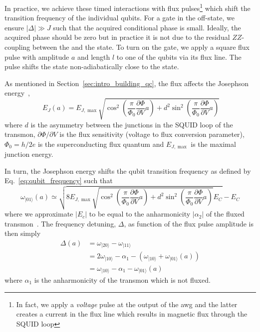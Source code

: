 In practice, we achieve these timed interactions with flux pulses\footnote{In fact, we apply a \textit{voltage} pulse at the output of the \gls{awg} and the latter creates a current in the flux line which results in magnetic flux through the SQUID loop} which shift the transition frequency of the individual qubits. For a gate in the off-state, we ensure $|\Delta|\gg J$ such that the acquired conditional phase is small. Ideally, the acquired phase should be zero but in practice it is not due to the residual $ZZ$-coupling between the \oo{} and the \tz{} state. To turn on the gate, we apply a square flux pulse with amplitude $a$ and length $l$ to one of the qubits via its flux line. The pulse shifts the \oo{} state non-adiabatically close to the \tz{} state. 

As mentioned in Section~\ref{sec:intro_building_qc}, the flux affects the Josephson energy~\cite[Eq.~2.18]{KochCharge-insensitiveBox}, 
\begin{equation}\
    E_J(a) = E _ { J , \max } \sqrt { \cos ^ { 2 } \left( \frac{\pi}{\Phi_0} \frac { \partial \Phi } { \partial V } a \right) + d ^ { 2 } \sin ^ { 2 } \left( \frac{\pi}{\Phi_0}\frac { \partial \Phi} { \partial V } a \right) }
\end{equation}
where $d$ is the asymmetry between the junctions in the SQUID loop of the transmon, $ \partial \Phi /\partial V $ is the flux sensitivity (voltage to flux conversion parameter), $\Phi_0 = h/2e$ is the superconducting flux quantum and $E _ { J , \max }$ is the maximal junction energy. 

In turn, the Josephson energy shifts the qubit transition frequency as defined by Eq.~\eqref{eq:qubit_frequency} such that
\begin{equation} \label{eq:carb_theory_freq01}
    \omega_{|01\rangle}(a) \simeq \sqrt{8  E _ { J , \max } \sqrt { \cos ^ { 2 } \left( \frac{\pi}{\Phi_0}\frac { \partial \Phi } {  \partial V } a \right) + d ^ { 2 } \sin ^ { 2 } \left( \frac{\pi}{\Phi_0}\frac { \partial \Phi} { \partial V } a \right)} E_{C}}-E_{C} 
\end{equation}
where we approximate $|E_c|$ to be equal to the anharmonicity $|\alpha_2|$ of the fluxed transmon~\cite[Eq. 2.12]{KochCharge-insensitiveBox}. 
The frequency detuning, $\Delta$, as function of the flux pulse amplitude is then simply
 \begin{equation}\label{eq:carb_detuning}
\begin{aligned} 
\Delta(a) & = \omega _ { | 20 \rangle } - \omega _ { | 11 \rangle } \\ 
& = 2 \omega _ { | 10 \rangle } - \alpha _ { 1 } - \left( \omega _ { | 10 \rangle } + \omega _ { | 01 \rangle }(a) \right) \\ 
& = \omega _ { | 10 \rangle } - \alpha _ { 1 } - \omega _ { | 01 \rangle }(a) 
\end{aligned}
\end{equation}
where $\alpha_1$ is the anharmonicity of the  transmon which is not fluxed.

